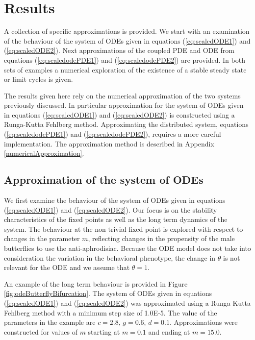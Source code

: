\documentclass[review,authoryear]{elsarticle}
\begin{document}
\section{Results}
\label{section:results}

A collection of specific approximations is provided. We start with an
examination of the behaviour of the system of ODEs given in equations
(\ref{eq:scaledODE1}) and (\ref{eq:scaledODE2}). Next approximations
of the coupled PDE and ODE from equations (\ref{eq:scaledodePDE1}) and
(\ref{eq:scaledodePDE2}) are provided. In both sets of examples a
numerical exploration of the existence of a stable steady state or
limit cycles is given.

The results given here rely on the numerical approximation of the two
systems previously discussed. In particular approximation for the
system of ODEs given in equations (\ref{eq:scaledODE1}) and
(\ref{eq:scaledODE2}) is constructed using a Runga-Kutta Fehlberg
method. Approximating the distributed system, equations
(\ref{eq:scaledodePDE1}) and (\ref{eq:scaledodePDE2}), requires a more
careful implementation. The approximation method is described in
Appendix \ref{numericalApproximation}.

\subsection{Approximation of the system of ODEs}
\label{subsection:odeApproximation}

We first examine the behaviour of the system of ODEs given in
equations (\ref{eq:scaledODE1}) and (\ref{eq:scaledODE2}). Our focus
is on the stability characteristics of the fixed points as well as the
long term dynamics of the system. The behaviour at the non-trivial
fixed point is explored with respect to changes in the parameter
$m$, reflecting changes in the propensity of the male butterflies to use the anti-aphrodisiac. Because the ODE model does not take into consideration the variation in the behavioral phenotype, the change in $\theta$ is not relevant for the ODE and we 
assume that $\theta=1$.

An example of the long term behaviour is provided in Figure
\ref{fig:odeButterflyBifurcation}. The system of ODEs given in
equations (\ref{eq:scaledODE1}) and (\ref{eq:scaledODE2}) was
approximated using a Runga-Kutta Fehlberg method with a minimum step
size of 1.0E-5.  The value of the parameters in the example are
$c=2.8$, $g=0.6$, $d=0.1$. Approximations were constructed for values
of $m$ starting at $m=0.1$ and ending at $m=15.0$.
\end{document}

